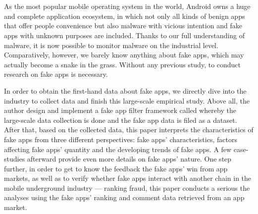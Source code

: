 \newpage
\cleardoublepage{}

\chapter*{}
\vspace{-5mm}

As the most popular mobile operating system in the world, Android owns a huge and complete application ecosystem, in which not only all kinds of benign apps that offer people convenience but also malware with vicious intention and fake apps with unknown purposes are included.
Thanks to our full understanding of malware, it is now possible to monitor malware on the industrial level.
Comparatively, however, we barely know anything about fake apps, which may actually become a snake in the grass.
Without any previous study, to conduct research on fake apps is necessary.

In order to obtain the first-hand data about fake apps, we directly dive into the industry to collect data and finish this large-scale empirical study.
Above all, the author design and implement a fake app filter framework called \mytool whereby the large-scale data collection is done and the fake app data is filed as a dataset.
After that, based on the collected data, this paper interprets the characteristics of fake apps from three different perspectives: fake apps' characteristics, factors affecting fake apps' quantity and the developing trends of fake apps.
A few case-studies afterward provide even more details on fake apps' nature.
One step further, in order to get to know the feedback the fake apps' win from app markets, as well as to verify whether fake apps interact with another chain in the mobile underground industry --- ranking fraud, this paper conducts a serious the analyses using the fake apps' ranking and comment data retrieved from an app market.

